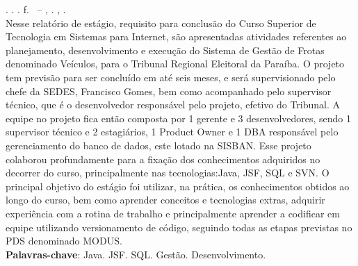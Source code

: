
\begin{resumo}[RESUMO]
\begin{SingleSpacing}

\imprimirautorcitacao. \imprimirtitulo. \imprimirdata. \pageref {LastPage} f. \imprimirprojeto\ – \imprimirprograma, \imprimirinstituicao. \imprimirlocal, \imprimirdata.\\

Nesse relatório de estágio, requisito para conclusão do Curso Superior de Tecnologia em Sistemas para Internet, são apresentadas atividades referentes ao planejamento, desenvolvimento e execução do Sistema de Gestão de Frotas denominado Veículos, para o Tribunal Regional Eleitoral da Paraíba. O projeto tem previsão para ser concluído em até seis meses, e será supervisionado pelo chefe da SEDES, Francisco Gomes, bem como acompanhado pelo supervisor técnico, que é o desenvolvedor responsável pelo projeto, efetivo do Tribunal. A equipe no projeto fica então composta por 1 gerente e 3 desenvolvedores, sendo 1 supervisor técnico e 2 estagiários, 1 Product Owner e 1 DBA responsável pelo gerenciamento do banco de dados, este lotado na SISBAN. Esse projeto colaborou profundamente para a fixação dos conhecimentos adquiridos no decorrer do curso, principalmente nas tecnologias:Java, JSF, SQL e SVN. O principal objetivo do estágio foi utilizar, na prática, os conhecimentos obtidos ao longo do curso, bem como aprender conceitos e tecnologias extras, adquirir experiência com a rotina de trabalho e principalmente aprender a codificar em equipe utilizando versionamento de código, seguindo todas as etapas previstas no PDS denominado MODUS.\\


\textbf{Palavras-chave}: Java. JSF. SQL. Gestão. Desenvolvimento.

\end{SingleSpacing}
\end{resumo}



